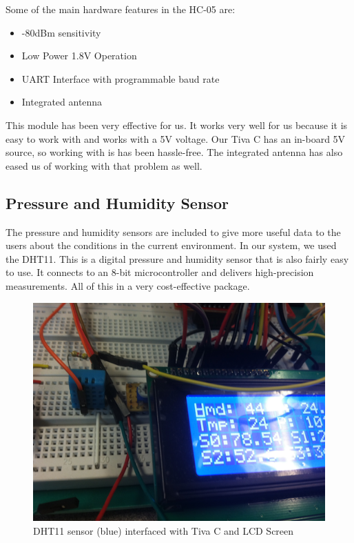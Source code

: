 		Some of the main hardware features in the HC-05 are:
		
		\begin{itemize}
		 \item -80dBm sensitivity
		 \item Low Power 1.8V Operation
		 \item UART Interface with programmable baud rate
		 \item Integrated antenna
        \end{itemize}
        
        This module has been very effective for us. It works very well for us because it is easy to work with and works with a 5V voltage. Our Tiva C has an in-board 5V source, so working with is has been hassle-free. The integrated antenna has also eased us of working with that problem as well. 	
		
		\subsection{Pressure and Humidity Sensor}
		
		The pressure and humidity sensors are included to give more useful data to the users about the conditions in the current environment. In our system, we used the DHT11. This is a digital pressure and humidity sensor that is also fairly easy to use. It connects to an 8-bit microcontroller and delivers high-precision measurements. All of this in a very cost-effective package. 
		
		\begin{figure}[H]
			\centering
				\includegraphics[scale=0.1]{img/DHT11}
			\caption{DHT11 sensor (blue) interfaced with Tiva C and LCD Screen}
		\end{figure}
		
